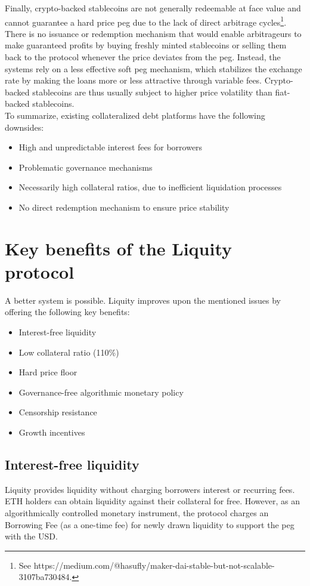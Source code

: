 \documentclass{article}
\begin{document}
Finally, crypto-backed stablecoins are not generally redeemable at face value and cannot guarantee a hard price peg due to the lack of direct arbitrage cycles\footnote{See https://medium.com/@hasufly/maker-dai-stable-but-not-scalable-3107ba730484.}. There is no issuance or redemption mechanism that would enable arbitrageurs to make guaranteed profits by buying freshly minted stablecoins or selling them back to the protocol whenever the price deviates from the peg. Instead, the systems rely on a less effective soft peg mechanism, which stabilizes the exchange rate by making the loans more or less attractive through variable fees. Crypto-backed stablecoins are thus usually subject to higher price volatility than fiat-backed stablecoins.\\

To summarize, existing collateralized debt platforms have the following downsides:
\begin{itemize}
    \item High and unpredictable interest fees for borrowers
    \item Problematic governance mechanisms
    \item Necessarily high collateral ratios, due to inefficient liquidation processes
    \item No direct redemption mechanism to ensure price stability
\end{itemize}
 
\section{Key benefits of the Liquity protocol}
A better system is possible. Liquity improves upon the mentioned issues by offering the following key benefits:
\begin{itemize}
    \item Interest-free liquidity
    \item Low collateral ratio (110\%)
    \item Hard price floor
    \item Governance-free algorithmic monetary policy
    \item Censorship resistance
    \item Growth incentives
\end{itemize}

\subsection{Interest-free liquidity}
Liquity provides liquidity without charging borrowers interest or recurring fees. ETH holders can obtain liquidity against their collateral for free. However, as an algorithmically controlled monetary instrument, the protocol charges an Borrowing Fee (as a one-time fee) for newly drawn liquidity to support the peg with the USD.
\end{document}
